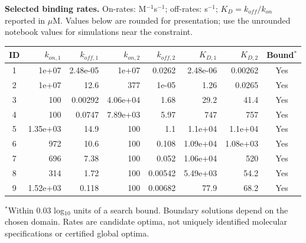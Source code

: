 \documentclass[10pt,a4paper]{article}
\begin{document}
\textbf{Selected binding rates.} On-rates: M$^{-1}$s$^{-1}$; off-rates: s$^{-1}$; $K_D=k_{off}/k_{on}$ reported in $\mu$M. Values below are rounded for presentation; use the unrounded notebook values for simulations near the constraint.
\begin{center}\small\begin{tabular}{crrrrrrc}\toprule
ID & $k_{on,1}$ & $k_{off,1}$ & $k_{on,2}$ & $k_{off,2}$ & $K_{D,1}$ & $K_{D,2}$ & Bound$^*$\\\midrule
1 & 1e+07 & 2.48e-05 & 1e+07 & 0.0262 & 2.48e-06 & 0.00262 & Yes \\
2 & 1e+07 & 12.6 & 377 & 1e-05 & 1.26 & 0.0265 & Yes \\
3 & 100 & 0.00292 & 4.06e+04 & 1.68 & 29.2 & 41.4 & Yes \\
4 & 100 & 0.0747 & 7.89e+03 & 5.97 & 747 & 757 & Yes \\
5 & 1.35e+03 & 14.9 & 100 & 1.1 & 1.1e+04 & 1.1e+04 & Yes \\
6 & 972 & 10.6 & 100 & 0.108 & 1.09e+04 & 1.08e+03 & Yes \\
7 & 696 & 7.38 & 100 & 0.052 & 1.06e+04 & 520 & Yes \\
8 & 314 & 1.72 & 100 & 0.00542 & 5.49e+03 & 54.2 & Yes \\
9 & 1.52e+03 & 0.118 & 100 & 0.00682 & 77.9 & 68.2 & Yes \\
\bottomrule\end{tabular}\end{center}
$^*$Within 0.03 log$_{10}$ units of a search bound. Boundary solutions depend on the chosen domain. Rates are candidate optima, not uniquely identified molecular specifications or certified global optima.
\newpage
\end{document}
